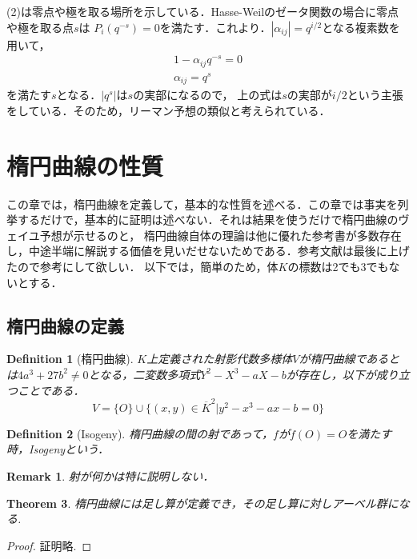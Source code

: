 \documentclass{ujarticle}
\newtheorem{thm}{Theorem}[section]
\newtheorem{dfn}[thm]{Definition}
\newtheorem*{rem}{Remark}
\begin{document}
(2)は零点や極を取る場所を示している．Hasse-Weilのゼータ関数の場合に零点や極を取る点$s$は
$P_i(q^{-s})=0$を満たす．これより．$|\alpha_{ij}|=q^{i/2}$となる複素数を用いて，
\begin{eqnarray*}
   1- \alpha_{ij} q^{-s}=0  \\
   \alpha_{ij} =q^{s}
\end{eqnarray*}
を満たす$s$となる．$|q^{s}|$は$s$の実部になるので，
上の式は$s$の実部が$i/2$という主張をしている．そのため，リーマン予想の類似と考えられている．


\section{楕円曲線の性質}
\label{sec:楕円曲線の性質}
この章では，楕円曲線を定義して，基本的な性質を述べる．この章では事実を列挙するだけで，基本的に証明は述べない．それは結果を使うだけで楕円曲線のヴェイユ予想が示せるのと，
楕円曲線自体の理論は他に優れた参考書が多数存在し，中途半端に解説する価値を見いだせないためである．参考文献は最後に上げたので参考にして欲しい．
以下では，簡単のため，体$K$の標数は2でも3でもないとする．

\subsection{楕円曲線の定義}
\label{sub:楕円曲線の定義}

\begin{dfn}[楕円曲線]
  $K$上定義された射影代数多様体$V$が楕円曲線であるとは$4a^3+27b^2\neq0$となる，二変数多項式$Y^2 - X^3 - aX - b$が存在し，以下が成り立つことである．
  \begin{equation*}
   V=\{O \} \cup \{ (x,y) \in \overline{K}^2 | y^2 - x^3 - ax - b=0 \}
  \end{equation*}
\end{dfn}

\begin{dfn}[Isogeny]
楕円曲線の間の射であって，$f$が$f(O)=O$を満たす時，Isogenyという．
\end{dfn}
\begin{rem}
 射が何かは特に説明しない．
\end{rem}

\begin{thm}
  楕円曲線には足し算が定義でき，その足し算に対しアーベル群になる.
\end{thm}
\begin{proof}
 証明略.
\end{proof}
\end{document}
